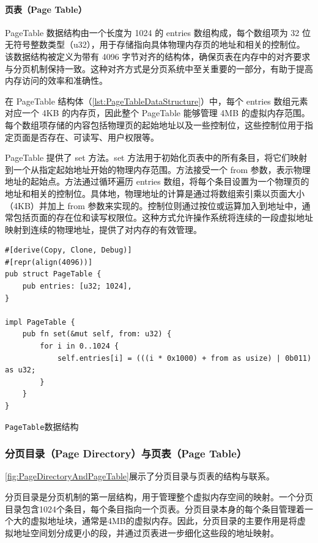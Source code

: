 \paragraph{页表（Page Table）}

PageTable 数据结构由一个长度为 1024 的 entries 数组构成，每个数组项为 32 位无符号整数类型（u32），用于存储指向具体物理内存页的地址和相关的控制位。该数据结构被定义为带有 4096 字节对齐的结构体，确保页表在内存中的对齐要求与分页机制保持一致。这种对齐方式是分页系统中至关重要的一部分，有助于提高内存访问的效率和准确性。

在 PageTable 结构体（\cref{lst:PageTableDataStructure}）中，每个 entries 数组元素对应一个 4KB 的内存页，因此整个 PageTable 能够管理 4MB 的虚拟内存范围。每个数组项存储的内容包括物理页的起始地址以及一些控制位，这些控制位用于指定页面是否存在、可读写、用户权限等。

PageTable 提供了 set 方法。set 方法用于初始化页表中的所有条目，将它们映射到一个从指定起始地址开始的物理内存范围。方法接受一个 from 参数，表示物理地址的起始点。方法通过循环遍历 entries 数组，将每个条目设置为一个物理页的地址和相关的控制位。具体地，物理地址的计算是通过将数组索引乘以页面大小（4KB）并加上 from 参数来实现的。控制位则通过按位或运算加入到地址中，通常包括页面的存在位和读写权限位。这种方式允许操作系统将连续的一段虚拟地址映射到连续的物理地址，提供了对内存的有效管理。

\begin{listing}[htbp]
    \begin{verbatim}
#[derive(Copy, Clone, Debug)]
#[repr(align(4096))]
pub struct PageTable {
    pub entries: [u32; 1024],
}

impl PageTable {
    pub fn set(&mut self, from: u32) {
        for i in 0..1024 {
            self.entries[i] = (((i * 0x1000) + from as usize) | 0b011) as u32;
        }
    }
}
    \end{verbatim}
    \caption{\texttt{PageTable}数据结构}\label{lst:PageTableDataStructure}
\end{listing}

\subsubsection{分页目录（Page Directory）与页表（Page Table）}

\cref{fig:PageDirectoryAndPageTable}展示了分页目录与页表的结构与联系。

分页目录是分页机制的第一层结构，用于管理整个虚拟内存空间的映射。一个分页目录包含1024个条目，每个条目指向一个页表。分页目录本身的每个条目管理着一个大的虚拟地址块，通常是4MB的虚拟内存。因此，分页目录的主要作用是将虚拟地址空间划分成更小的段，并通过页表进一步细化这些段的地址映射。

